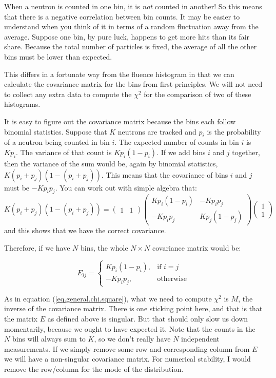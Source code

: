 \documentclass[letterpaper,12pt]{article}
\newcommand{\myMatrix}[1]{\bm{\mathit{#1}}}
\begin{document}
When a neutron is counted in one bin, it is \textit{not} counted in another! So this means that there is a negative correlation between bin counts. It may be easier to understand when you think of it in terms of a random fluctuation away from the average. Suppose one bin, by pure luck, happens to get more hits than its fair share. Because the total number of particles is fixed, the average of all the other bins must be lower than expected.

This differs in a fortunate way from the fluence histogram in that we can calculate the covariance matrix for the bins from first principles. We will not need to collect any extra data to compute the $\chi^2$ for the comparison of two of these histograms.

It is easy to figure out the covariance matrix because the bins each follow binomial statistics. Suppose that $K$ neutrons are tracked and $p_i$ is the probability of a neutron being counted in bin $i$. The expected number of counts in bin $i$ is $Kp_i$. The variance of that count is $Kp_i(1-p_i)$. If we add bins $i$ and $j$ together, then the variance of the sum would be, again by binomial statistics, $K(p_i+p_j)(1-(p_i+p_j))$. This means that the covariance of bins $i$ and $j$ must be $-Kp_ip_j$. You can work out with simple algebra that:
\begin{equation}
	K(p_i+p_j)(1-(p_i+p_j))=
	\begin{pmatrix}
		1 & 1
	\end{pmatrix}
	\begin{pmatrix}
	Kp_i(1-p_i) & -Kp_ip_j \\
	-Kp_ip_j & Kp_j(1-p_j) 
	\end{pmatrix}
	\begin{pmatrix}
	1 \\
	1
	\end{pmatrix}
\end{equation}
and this shows that we have the correct covariance.

Therefore, if we have $N$ bins, the whole $N \times N$ covariance matrix would be:

\begin{equation} \label{eq.cov.E}
	\myMatrix{E}_{ij}=
	\begin{cases}
		Kp_i(1-p_i), & \text{if } i=j \\
		-Kp_ip_j,  & \text{otherwise}
	\end{cases}
\end{equation}

As in equation (\ref{eq.general.chi.square}), what we need to compute $\chi^2$ is $\myMatrix{M}$, the inverse of the covariance matrix. There is one sticking point here, and that is that the matrix $\myMatrix{E}$ as defined above is singular. But that should only slow us down momentarily, because we ought to have expected it. Note that the counts in the $N$ bins will always sum to $K$, so we don't really have $N$ independent measurements. If we simply remove some row and corresponding column from $\myMatrix{E}$ we will have a non-singular covariance matrix. For numerical stability, I would remove the row/column for the mode of the distribution.
\end{document}

